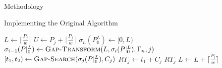 \documentclass{article}
\begin{document}
\begin{section}{Methodology}
  \begin{subsection}{Implementing the Original Algorithm}
    \begin{algorithm}
      \caption{Gap-Enumeration Algorithm}\label{gapenum1}
      \begin{algorithmic}[1]
          \State $L \gets \lceil\frac{P_{j}}{w}\rceil$
          \State $U \gets P_{j} + \lceil\frac{P_{j}}{w}\rceil$
            \State $\sigma_{n}(P_{0}^{L}) \gets {[0,L)}$
              \State $\sigma_{i-1}(P|_{0}^{L}) \gets \Call{Gap-Transform}{L, \sigma_{i}(P|_{0}^{L}), \Gamma_{n}, j}$
                \State {}
              \EndIf
            \EndFor
            \State $[t_{1},t_{2}) \gets \Call{Gap-Search}{\sigma_{j}(P|_{0}^{L}), C_{j}}$
              \State $RT_{j} \gets t_{1} + C_{j}$
            \EndIf
              \State \Return $RT_{j}$
            \EndIf
            \State $L \gets L + \lceil\frac{P_{j}}{w}\rceil$
          \EndWhile
        \State {}
      \EndFunction
      \end{algorithmic}
    \end{algorithm}


\end{subsection}
\end{section}
\end{document}
